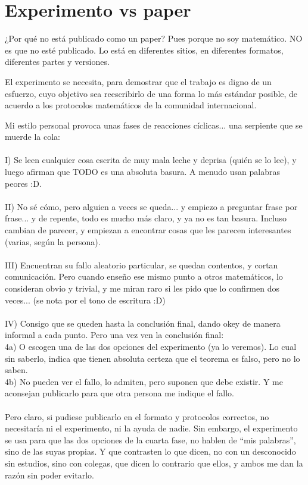 \chapter{Experimento vs paper}

\noindent
¿Por qué no está publicado como un paper? Pues porque no soy matemático. NO es que no esté publicado. Lo está en diferentes sitios, en diferentes formatos, diferentes partes y versiones.

\noindent
El experimento se necesita, para demostrar que el trabajo es digno de un esfuerzo, cuyo objetivo sea reescribirlo de una forma lo más estándar posible, de acuerdo a los protocolos matemáticos de la comunidad internacional.

\noindent
Mi estilo personal provoca unas fases de reacciones cíclicas... una serpiente que se muerde la cola:\\\\
I) Se leen cualquier cosa escrita de muy mala leche y deprisa (quién se lo lee), y luego afirman que TODO es una absoluta basura. A menudo usan palabras peores :D.\\\\
II) No sé cómo, pero alguien a veces se queda... y empiezo a preguntar frase por frase... y de repente, todo es mucho más claro, y ya no es tan basura. Incluso cambian de parecer, y empiezan a encontrar cosas que les parecen interesantes (varias, según la persona).\\\\
III) Encuentran su fallo aleatorio particular, se quedan contentos, y cortan comunicación. Pero cuando enseño ese mismo punto a otros matemáticos, lo consideran obvio y trivial, y me miran raro si les pido que lo confirmen dos veces... (se nota por el tono de escritura :D)\\\\
IV) Consigo que se queden hasta la conclusión final, dando okey de manera informal a cada punto. Pero una vez ven la conclusión final:\\
4a) O escogen una de las dos opciones del experimento (ya lo veremos). Lo cual sin saberlo, indica que tienen absoluta certeza que el teorema es falso, pero no lo saben.\\
4b) No pueden ver el fallo, lo admiten, pero suponen que debe existir. Y me aconsejan publicarlo para que otra persona me indique el fallo.\\\\

\noindent
Pero claro, si pudiese publicarlo en el formato y protocolos correctos, no necesitaría ni el experimento, ni la ayuda de nadie. Sin embargo, el experimento se usa para que las dos opciones de la cuarta fase, no hablen de ``mis palabras'', sino de las suyas propias. Y que contrasten lo que dicen, no con un desconocido sin estudios, sino con colegas, que dicen lo contrario que ellos, y ambos me dan la razón sin poder evitarlo.

